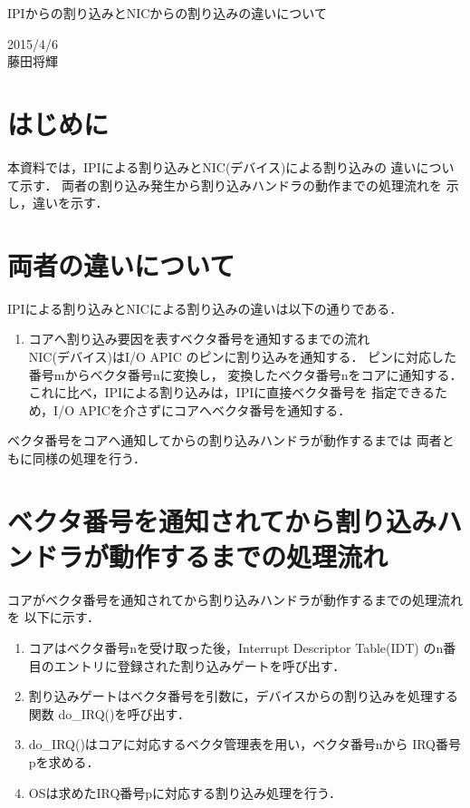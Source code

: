 \documentclass[12pt]{jsarticle}
\begin{document}

\begin{center}
{\LARGE IPIからの割り込みとNICからの割り込みの違いについて}
\end{center}

\begin{flushright}
  2015/4/6\\
  藤田将輝
\end{flushright}
\section{はじめに}
本資料では，IPIによる割り込みとNIC(デバイス)による割り込みの
違いについて示す．
両者の割り込み発生から割り込みハンドラの動作までの処理流れを
示し，違いを示す．
\section{両者の違いについて}
IPIによる割り込みとNICによる割り込みの違いは以下の通りである．
\begin{enumerate}
    \item コアへ割り込み要因を表すベクタ番号を通知するまでの流れ\\
        NIC(デバイス)はI/O APIC のピンに割り込みを通知する．
        ピンに対応した番号mからベクタ番号nに変換し，
        変換したベクタ番号nをコアに通知する．
        これに比べ，IPIによる割り込みは，IPIに直接ベクタ番号を
        指定できるため，I/O APICを介さずにコアへベクタ番号を通知する．
\end{enumerate}
ベクタ番号をコアへ通知してからの割り込みハンドラが動作するまでは
両者ともに同様の処理を行う．
\section{ベクタ番号を通知されてから割り込みハンドラが動作するまでの処理流れ}
コアがベクタ番号を通知されてから割り込みハンドラが動作するまでの処理流れを
以下に示す．
\begin{enumerate}
    \item
        コアはベクタ番号nを受け取った後，Interrupt Descriptor Table(IDT) 
        のn番目のエントリに登録された割り込みゲートを呼び出す．
    \item 
        割り込みゲートはベクタ番号を引数に，デバイスからの割り込みを処理する
        関数 do\_IRQ()を呼び出す．
    \item 
        do\_IRQ()はコアに対応するベクタ管理表を用い，ベクタ番号nから
        IRQ番号pを求める．
    \item
        OSは求めたIRQ番号pに対応する割り込み処理を行う．
\end{enumerate}
\end{document}
